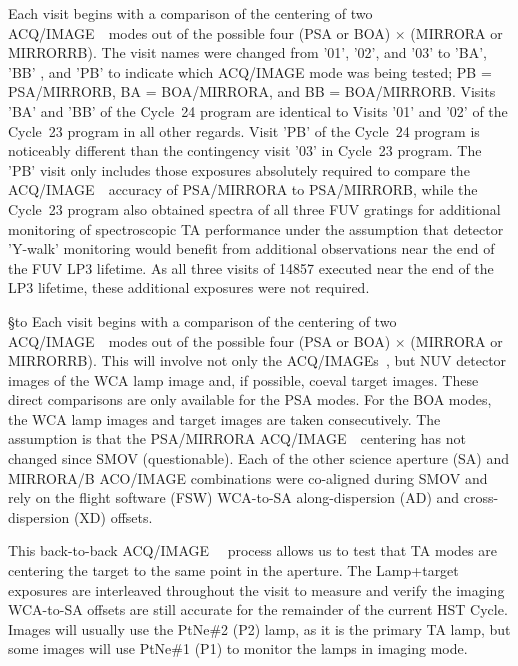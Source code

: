 \documentclass[12pt]{reportj}
\newcommand*{\myfont}{\fontfamily{rm}\selectfont}
\def\acqimage{{\myfont ACQ/IMAGE}\rm~}
\def\acqimages{{\myfont ACQ/IMAGE{\rm s}}\rm~}
\def\ssection#1{\addtocounter{section}{1} \setcounter{subsection}{0} \S*{\hbox to \hsize{\large\bf \arabic{section}. #1\hfill }}}
\begin{document}
Each visit begins with a comparison of the centering of two \acqimage~modes out of the possible four (PSA or BOA) $\times$ (MIRRORA or MIRRORRB). The visit names were changed from '01', '02', and '03' to 'BA', 'BB' , and 'PB' to indicate which ACQ/IMAGE mode was being tested; PB = PSA/MIRRORB, BA = BOA/MIRRORA, and BB = BOA/MIRRORB. Visits 'BA' and 'BB' of the Cycle~24 program are identical to Visits '01' and '02' of the Cycle~23 program in all other regards.
Visit 'PB' of the Cycle~24 program is noticeably different than the contingency visit '03' in Cycle~23 program. The 'PB' visit only includes those exposures absolutely required to compare the \acqimage~accuracy of PSA/MIRRORA to PSA/MIRRORB, while the Cycle~23 program also obtained spectra of all three FUV gratings for additional monitoring of spectroscopic TA performance under the assumption that detector 'Y-walk' monitoring would benefit from additional observations near the end of the FUV LP3 lifetime. As all three visits of 14857 executed near the end of the LP3 lifetime, these additional exposures were not required.
\clearpage
\ssection{Program Structure \label{sec:structure}}
Each visit begins with a comparison of the centering of two \acqimage~modes out of the possible four (PSA or BOA) $\times$ (MIRRORA or MIRRORRB). This will involve not only the \acqimages, but NUV detector images of the WCA lamp image and, if possible, coeval target images. These direct comparisons are only available for the PSA modes. For the BOA modes, the WCA lamp images and target images are taken consecutively. The assumption is that the PSA/MIRRORA \acqimage~centering has not changed since SMOV (questionable). Each of the other science aperture (SA) and MIRRORA/B ACO/IMAGE combinations were co-aligned during SMOV and rely on the flight software
(FSW) WCA-to-SA along-dispersion (AD) and cross-dispersion (XD) offsets.

This back-to-back \acqimage~ process allows us to test that TA modes are centering the target to the same point in the aperture. The Lamp+target exposures are interleaved throughout the visit to measure and verify the imaging WCA-to-SA offsets are still accurate for the remainder of the current HST Cycle. Images will usually use the PtNe\#2 (P2) lamp, as it is the primary TA lamp, but some images will use PtNe\#1 (P1) to monitor the lamps in imaging mode.
\end{document}
